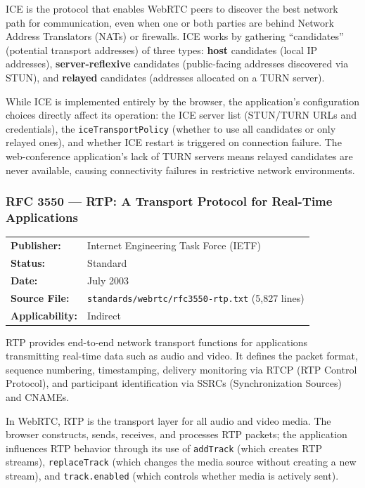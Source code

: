 \documentclass[11pt,letterpaper]{article}
\begin{document}
\vspace{0.5em}
ICE is the protocol that enables WebRTC peers to discover the best network path for communication, even when one or both parties are behind Network Address Translators (NATs) or firewalls. ICE works by gathering ``candidates'' (potential transport addresses) of three types: \textbf{host} candidates (local IP addresses), \textbf{server-reflexive} candidates (public-facing addresses discovered via STUN), and \textbf{relayed} candidates (addresses allocated on a TURN server).

While ICE is implemented entirely by the browser, the application's configuration choices directly affect its operation: the ICE server list (STUN/TURN URLs and credentials), the \texttt{iceTransportPolicy} (whether to use all candidates or only relayed ones), and whether ICE restart is triggered on connection failure. The web-conference application's lack of TURN servers means relayed candidates are never available, causing connectivity failures in restrictive network environments.

\subsubsection{RFC 3550 --- RTP: A Transport Protocol for Real-Time Applications}
\label{app:rfc3550}

\begin{tabular}{ll}
\textbf{Publisher:} & Internet Engineering Task Force (IETF) \\
\textbf{Status:} & Standard \\
\textbf{Date:} & July 2003 \\
\textbf{Source File:} & \texttt{standards/webrtc/rfc3550-rtp.txt} (5,827 lines) \\
\textbf{Applicability:} & Indirect \\
\end{tabular}

\vspace{0.5em}
RTP provides end-to-end network transport functions for applications transmitting real-time data such as audio and video. It defines the packet format, sequence numbering, timestamping, delivery monitoring via RTCP (RTP Control Protocol), and participant identification via SSRCs (Synchronization Sources) and CNAMEs.

In WebRTC, RTP is the transport layer for all audio and video media. The browser constructs, sends, receives, and processes RTP packets; the application influences RTP behavior through its use of \texttt{addTrack} (which creates RTP streams), \texttt{replaceTrack} (which changes the media source without creating a new stream), and \texttt{track.enabled} (which controls whether media is actively sent).
\end{document}
